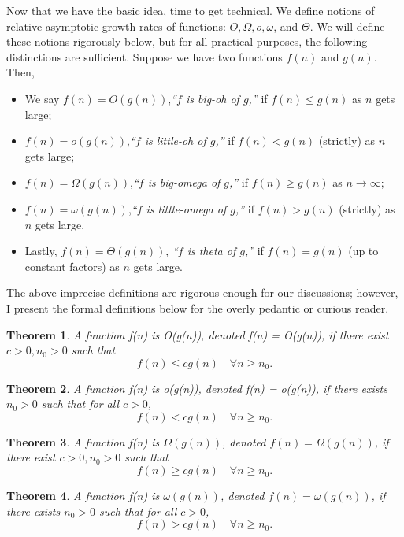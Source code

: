 \documentclass[12pt,twoside]{reedthesis}
\newtheorem{theorem}{Theorem}
\begin{document}
Now that we have the basic idea, time to get technical. We define notions of relative asymptotic growth rates of functions: $O, \Omega, o, \omega$, and $\Theta$. We will define these notions rigorously below, but for all practical purposes, the following distinctions are sufficient. Suppose we have two functions $f(n)$ and $g(n)$. Then, 
\begin{itemize}
\item We say $f(n) = O(g(n))$,\textit{``$f$ is big-oh of $g$,''} if $f(n) \leq g(n)$ as $n$ gets large;
\item $f(n) = o(g(n))$,\textit{``$f$ is little-oh of $g$,''} if $f(n) < g(n)$ (strictly) as $n$ gets large;
\item $f(n) = \Omega(g(n))$,\textit{``$f$ is big-omega of $g$,''} if $f(n) \geq g(n)$ as $n \rightarrow \infty$;
\item $f(n) = \omega(g(n))$,\textit{``$f$ is little-omega of $g$,''} if $f(n) > g(n)$ (strictly) as $n$ gets large.
\item Lastly, $f(n) = \Theta(g(n))$, \textit{``$f$ is theta of $g$,''} if $f(n) = g(n)$ (up to constant factors) as $n$ gets large.
\end{itemize}
The above imprecise definitions are rigorous enough for our discussions; however, I present the formal definitions below for the overly pedantic or curious reader. 
 
\begin{theorem}
A function f(n) is O(g(n)), denoted f(n) = O(g(n)), if there exist $c>0, n_0>0$ such that
$$f(n) \leq c g(n) \quad \forall n\geq n_0.$$
\end{theorem}

\begin{theorem}
A function f(n) is o(g(n)), denoted f(n) = o(g(n)), if there exists $n_0>0$ such that for all $c>0$,
$$f(n) < c g(n) \quad \forall n\geq n_0.$$
\end{theorem}

\begin{theorem}
A function f(n) is $\Omega(g(n))$, denoted $f(n) = \Omega(g(n))$, if there exist $c>0, n_0>0$ such that
$$f(n) \geq c g(n) \quad \forall n\geq n_0.$$
\end{theorem}

\begin{theorem}
A function f(n) is $\omega(g(n))$, denoted $f(n) = \omega(g(n))$, if there exists $n_0>0$ such that for all $c>0$,
$$f(n) > c g(n) \quad \forall n\geq n_0.$$
\end{theorem}
\end{document}
